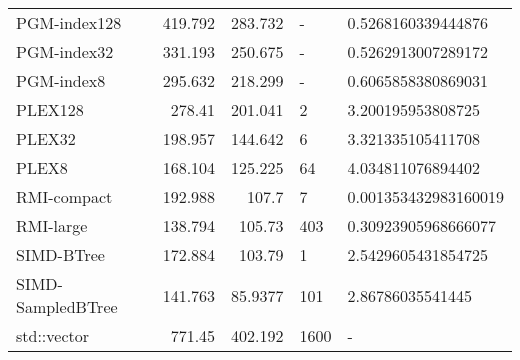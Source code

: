 \begin{tabular}{lrrll}
 PGM-index128      &                419.792 &              283.732  & -            & 0.5268160339444876   \\
 PGM-index32       &                331.193 &              250.675  & -            & 0.5262913007289172   \\
 PGM-index8        &                295.632 &              218.299  & -            & 0.6065858380869031   \\
 PLEX128           &                278.41  &              201.041  & 2            & 3.200195953808725    \\
 PLEX32            &                198.957 &              144.642  & 6            & 3.321335105411708    \\
 PLEX8             &                168.104 &              125.225  & 64           & 4.034811076894402    \\
 RMI-compact       &                192.988 &              107.7    & 7            & 0.001353432983160019 \\
 RMI-large         &                138.794 &              105.73   & 403          & 0.30923905968666077  \\
 SIMD-BTree        &                172.884 &              103.79   & 1            & 2.5429605431854725   \\
 SIMD-SampledBTree &                141.763 &               85.9377 & 101          & 2.86786035541445     \\
 std::vector       &                771.45  &              402.192  & 1600         & -                    \\
\hline
\end{tabular}